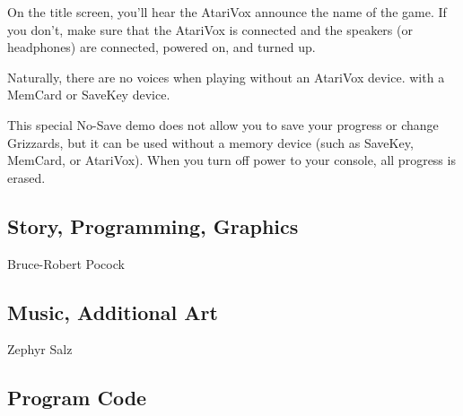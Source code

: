 \documentclass[9pt,twocolumn,openany,article]{memoir}
\begin{document}
On the title  screen, you'll hear the AtariVox announce  the name of the
game. If  you don't, make  sure that the  AtariVox is connected  and the
speakers (or headphones) are connected, powered on, and turned up.

Naturally,  there are  no  voices  when playing  \ifdefined\ATARIAGESAVE
without an AtariVox device. \else with a MemCard or SaveKey device. \fi

\fi

\ifdefined\NOSAVE

{}

This special  No-Save demo does not  allow you to save  your progress or
change Grizzards,  but it can be  used without a memory  device (such as
SaveKey, MemCard, or AtariVox). When you turn off power to your console,
all progress is erased.

\fi

\fi %





\subsection{\small Story, Programming, Graphics}

{ \small Bruce-Robert Pocock }

\subsection{\small Music, Additional Art}

{ \small Zephyr Salz }

\subsection{\small Program Code}
\end{document}
